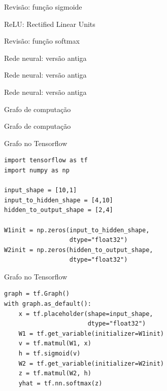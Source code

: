\documentclass[10pt]{beamer}
\begin{document}
\begin{frame}[fragile]{Revisão: função sigmoide}

\end{frame}

\begin{frame}[fragile]{ReLU: Rectified Linear Units}

\end{frame}

\begin{frame}[fragile]{Revisão: função softmax}

\end{frame}

\begin{frame}[fragile]{Rede neural: versão antiga}

\end{frame}

\begin{frame}[fragile]{Rede neural: versão antiga}

\end{frame}

\begin{frame}[fragile]{Rede neural: versão antiga}
\begin{center}

\end{center}
\end{frame}

\begin{frame}[fragile]{Grafo de computação}

\end{frame}

\begin{frame}[fragile]{Grafo de computação}

\end{frame}

\begin{frame}[fragile]{Grafo no Tensorflow}
\begin{verbatim}
import tensorflow as tf
import numpy as np

input_shape = [10,1]
input_to_hidden_shape = [4,10]
hidden_to_output_shape = [2,4]

W1init = np.zeros(input_to_hidden_shape,
                  dtype="float32")
W2init = np.zeros(hidden_to_output_shape,
                  dtype="float32")
\end{verbatim}
\end{frame}


\begin{frame}[fragile]{Grafo no Tensorflow}
\begin{verbatim}
graph = tf.Graph() 
with graph.as_default():
    x = tf.placeholder(shape=input_shape,
                       dtype="float32") 
    W1 = tf.get_variable(initializer=W1init)
    v = tf.matmul(W1, x)
    h = tf.sigmoid(v)
    W2 = tf.get_variable(initializer=W2init)
    z = tf.matmul(W2, h)
    yhat = tf.nn.softmax(z)
\end{verbatim}
\end{frame}
\end{document}
